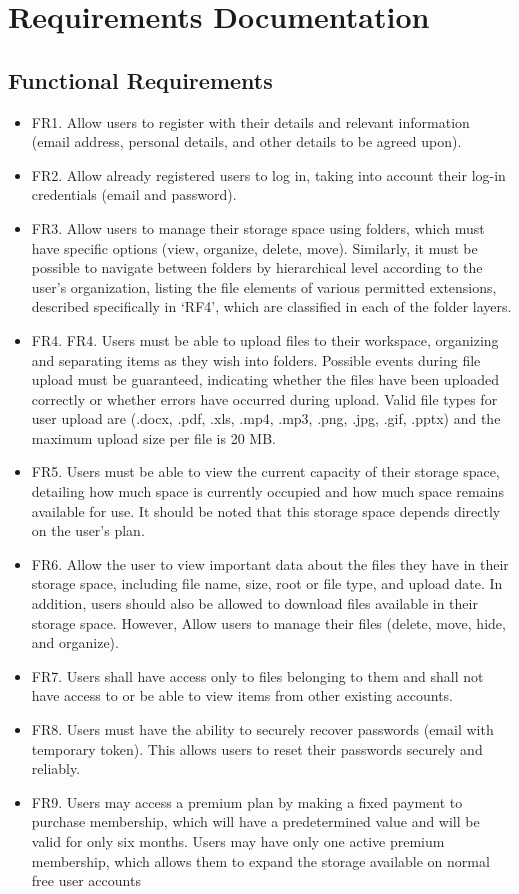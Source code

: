 \section{Requirements Documentation}
\subsection{Functional Requirements}
\begin{itemize}
    \item FR1. Allow users to register with their details and relevant information (email address, personal details, and other details to be agreed upon).
    \item FR2. Allow already registered users to log in, taking into account their log-in credentials (email and password).
    \item FR3. Allow users to manage their storage space using folders, which must have specific options (view, organize, delete, move). Similarly, it must be possible to navigate between folders by hierarchical level according to the user's organization, listing the file elements of various permitted extensions, described specifically in ‘RF4’, which are classified in each of the folder layers.
    \item FR4. FR4. Users must be able to upload files to their workspace, organizing and separating items as they wish into folders. Possible events during file upload must be guaranteed, indicating whether the files have been uploaded correctly or whether errors have occurred during upload. Valid file types for user upload are (.docx, .pdf, .xls, .mp4, .mp3, .png, .jpg, .gif, .pptx) and the maximum upload size per file is 20 MB.
    \item FR5. Users must be able to view the current capacity of their storage space, detailing how much space is currently occupied and how much space remains available for use. It should be noted that this storage space depends directly on the user's plan.
    \item FR6. Allow the user to view important data about the files they have in their storage space, including file name, size, root or file type, and upload date. In addition, users should also be allowed to download files available in their storage space.
    However, Allow users to manage their files (delete, move, hide, and organize).
    \item FR7. Users shall have access only to files belonging to them and shall not have access to or be able to view items from other existing accounts.
    \item FR8. Users must have the ability to securely recover passwords (email with temporary token). This allows users to reset their passwords securely and reliably.
    \item FR9. Users may access a premium plan by making a fixed payment to purchase membership, which will have a predetermined value and will be valid for only six months. Users may have only one active premium membership, which allows them to expand the storage available on normal free user accounts
\end{itemize}
